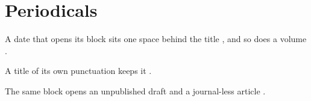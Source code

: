 \documentclass[acmsmall,nonacm]{acmart}
\begin{document}
\thispagestyle{empty}%

\section{Periodicals}
A date that opens its block sits one space behind the title \citep{PerBare}, and so does a volume \citep{PerVolNum,PerJournal}.

A title of its own punctuation keeps it \citep{PerBang}.

The same block opens an unpublished draft \citep{UnpDraft} and a journal-less article \citep{ArtNoJournal}.



\end{document}
